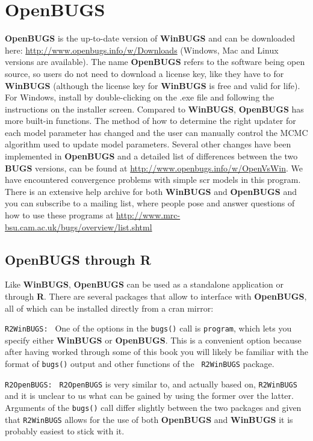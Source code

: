 \section{OpenBUGS}

{\bf OpenBUGS} is the up-to-date version of {\bf WinBUGS} and can be
downloaded here: \url{http://www.openbugs.info/w/Downloads} (Windows,
Mac and Linux versions are available).  The name {\bf OpenBUGS} refers
to the software being open source, so users do not need to download a
license key, like they have to for {\bf WinBUGS} (although the license
key for {\bf WinBUGS} is free and valid for life). For Windows,
install by double-clicking on the .exe file and following the
instructions on the installer screen. Compared to {\bf WinBUGS}, {\bf
  OpenBUGS} has more built-in functions. The method of how to
determine the right updater for each model parameter has changed and
the user can manually control the MCMC algorithm used to update model
parameters.  Several other changes have been implemented in {\bf
  OpenBUGS} and a detailed list of differences between the two {\bf
  BUGS} versions, can be found at
\url{http://www.openbugs.info/w/OpenVsWin}. We have encountered
convergence problems with simple scr models in this program.  There is
an extensive help archive for both {\bf WinBUGS} and {\bf OpenBUGS}
and you can subscribe to a mailing list, where people pose and answer
questions of how to use these programs at
\url{http://www.mrc-bsu.cam.ac.uk/bugs/overview/list.shtml}

\subsection{OpenBUGS through R}

Like {\bf WinBUGS}, {\bf OpenBUGS} can be used as a standalone
application or through {\bf R}. There are several packages that allow
{\R} to interface with {\bf OpenBUGS}, all of which can be installed
directly from a cran mirror:

{\flushleft \tt R2WinBUGS: } One of the options in the {\tt bugs()}
call is {\tt program}, which lets you specify either {\bf WinBUGS} or
{\bf OpenBUGS}. This is a convenient option because after having
worked through some of this book you will likely be familiar with the
format of {\tt bugs()} output and other functions of the {\tt
  R2WinBUGS} package.

{\flushleft \tt R2OpenBUGS: } {\tt R2OpenBUGS}
\citep{sturtz_etal:2005} is very similar to, and actually based on,
{\tt R2WinBUGS} and it is unclear to us what can be gained by using
the former over the latter. Arguments of the {\tt bugs()} call differ
slightly between the two packages and given that {\tt R2WinBUGS}
allows for the use of both {\bf OpenBUGS} and {\bf WinBUGS} it is
probably easiest to stick with it.

